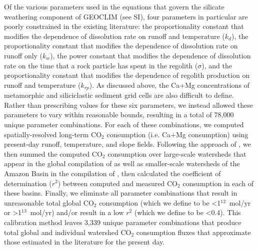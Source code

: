 \documentclass[11pt,letterpaper]{article}
\newcommand{\COtwo}{CO$_{2}$\xspace}
\begin{document}
Of the various parameters used in the equations that govern the silicate weathering component of GEOCLIM (see SI), four parameters in particular are poorly constrained in the existing literature: the proportionality constant that modifies the dependence of dissolution rate on runoff and temperature ($k_{d}$), the proportionality constant that modifies the dependence of dissolution rate on runoff only ($k_{w}$), the power constant that modifies the dependence of dissolution rate on the time that a rock particle has spent in the regolith ($\sigma$), and the proportionality constant that modifies the dependence of regolith production on runoff and temperature ($k_{rp}$). As discussed above, the Ca+Mg concentrations of metamorphic and siliciclastic sediment grid cells are also difficult to define. Rather than prescribing values for these six parameters, we instead allowed these parameters to vary within reasonable bounds, resulting in a total of 78,000 unique parameter combinations. For each of these combinations, we computed spatially-resolved long-term \COtwo consumption (i.e. Ca+Mg consumption) using present-day runoff, temperature, and slope fields. Following the approach of \citet{Maffre2018a}, we then summed the computed \COtwo consumption over large-scale watersheds that appear in the global compilation of \citet{Gaillardet1999a} as well as smaller-scale watersheds of the Amazon Basin in the compilation of \citet{Moquet2011a, Moquet2016a, Moquet2018a}, then calculated the coefficient of determination ($r^{2}$) between computed and measured \COtwo consumption in each of these basins. Finally, we eliminate all parameter combinations that result in unreasonable total global \COtwo consumption (which we define to be \textless1$^{12}$~mol/yr or \textgreater1$^{13}$~mol/yr) and/or result in a low $r^{2}$ (which we define to be \textless0.4). This calibration method leaves 3,339 unique parameter combinations that produce total global and individual watershed \COtwo consumption fluxes that approximate those estimated in the literature for the present day.
\end{document}
